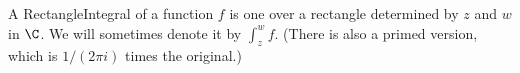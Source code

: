 \begin{definition}[RectangleIntegral]
\label{RectangleIntegral}
\leanok
A RectangleIntegral of a function $f$ is one over a rectangle
  determined by $z$ and $w$ in $\C$.
  We will sometimes denote it by $\int_{z}^{w} f$.
  (There is also a primed version, which is
  $1/(2\pi i)$ times the original.)
\end{definition}
